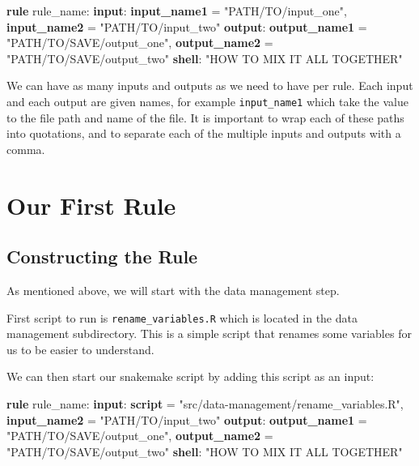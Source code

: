 \documentclass[]{book}
\newenvironment{Shaded}{\begin{snugshade}}{\end{snugshade}}
\newcommand{\KeywordTok}[1]{\textcolor[rgb]{0.13,0.29,0.53}{\textbf{{#1}}}}
\newcommand{\StringTok}[1]{\textcolor[rgb]{0.31,0.60,0.02}{{#1}}}
\newcommand{\NormalTok}[1]{{#1}}
\theoremstyle{definition}
\theoremstyle{definition}
\theoremstyle{definition}
\theoremstyle{remark}
\begin{document}
\begin{Shaded}
\begin{Highlighting}[]
\KeywordTok{rule} \NormalTok{rule_name:}
    \KeywordTok{input}\NormalTok{:}
        \KeywordTok{input_name1} \NormalTok{= }\StringTok{"PATH/TO/input_one"}\NormalTok{,}
        \KeywordTok{input_name2} \NormalTok{= }\StringTok{"PATH/TO/input_two"}
    \KeywordTok{output}\NormalTok{:}
        \KeywordTok{output_name1} \NormalTok{= }\StringTok{"PATH/TO/SAVE/output_one"}\NormalTok{,}
        \KeywordTok{output_name2} \NormalTok{= }\StringTok{"PATH/TO/SAVE/output_two"}
    \KeywordTok{shell}\NormalTok{:}
        \StringTok{"HOW TO MIX IT ALL TOGETHER"}
\end{Highlighting}
\end{Shaded}

We can have as many inputs and outputs as we need to have per rule. Each
input and each output are given names, for example \texttt{input\_name1}
which take the value to the file path and name of the file. It is
important to wrap each of these paths into quotations, and to separate
each of the multiple inputs and outputs with a comma.

\section{Our First Rule}\label{our-first-rule}

\subsection{Constructing the Rule}\label{constructing-the-rule}

As mentioned above, we will start with the data management step.

First script to run is \texttt{rename\_variables.R} which is located in
the data management subdirectory. This is a simple script that renames
some variables for us to be easier to understand.

We can then start our snakemake script by adding this script as an
input:

\begin{Shaded}
\begin{Highlighting}[]
\KeywordTok{rule} \NormalTok{rule_name:}
    \KeywordTok{input}\NormalTok{:}
        \KeywordTok{script} \NormalTok{= }\StringTok{"src/data-management/rename_variables.R"}\NormalTok{,}
        \KeywordTok{input_name2} \NormalTok{= }\StringTok{"PATH/TO/input_two"}
    \KeywordTok{output}\NormalTok{:}
        \KeywordTok{output_name1} \NormalTok{= }\StringTok{"PATH/TO/SAVE/output_one"}\NormalTok{,}
        \KeywordTok{output_name2} \NormalTok{= }\StringTok{"PATH/TO/SAVE/output_two"}
    \KeywordTok{shell}\NormalTok{:}
        \StringTok{"HOW TO MIX IT ALL TOGETHER"}
\end{Highlighting}
\end{Shaded}
\end{document}
